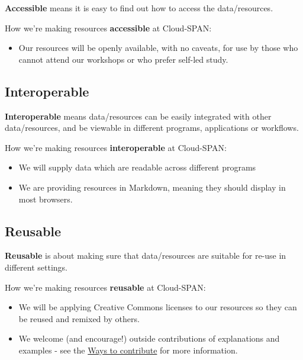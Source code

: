 \documentclass[
]{book}
\providecommand{\tightlist}{%
  \setlength{\itemsep}{0pt}\setlength{\parskip}{0pt}}
\begin{document}
\textbf{Accessible} means it is easy to find out how to access the data/resources.

How we're making resources \textbf{accessible} at Cloud-SPAN:

\begin{itemize}
\tightlist
\item
  Our resources will be openly available, with no caveats, for use by those who cannot attend our workshops or who prefer self-led study.
\end{itemize}

\hypertarget{interoperable}{%
\subsection*{Interoperable}\label{interoperable}}

\textbf{Interoperable} means data/resources can be easily integrated with other data/resources, and be viewable in different programs, applications or workflows.

How we're making resources \textbf{interoperable} at Cloud-SPAN:

\begin{itemize}
\tightlist
\item
  We will supply data which are readable across different programs
\item
  We are providing resources in Markdown, meaning they should display in most browsers.
\end{itemize}

\hypertarget{reusable}{%
\subsection*{Reusable}\label{reusable}}

\textbf{Reusable} is about making sure that data/resources are suitable for re-use in different settings.

How we're making resources \textbf{reusable} at Cloud-SPAN:

\begin{itemize}
\tightlist
\item
  We will be applying Creative Commons licenses to our resources so they can be reused and remixed by others.
\item
  We welcome (and encourage!) outside contributions of explanations and examples - see the \protect\hyperlink{ways-to-contribute}{Ways to contribute} for more information.
\end{itemize}
\end{document}
